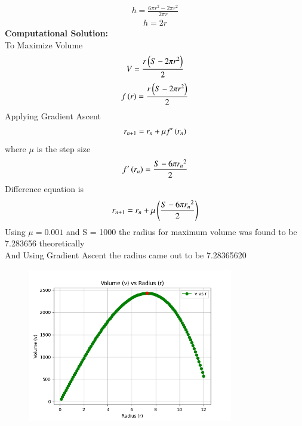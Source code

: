\documentclass[journal]{IEEEtran}
\numberwithin{equation}{enumi}
\numberwithin{figure}{enumi}
\begin{document}
\begin{align}
	h = \frac{6\pi r^2 - 2\pi r^2}{2\pi r}
\end{align}
\begin{align}
	h = 2r
\end{align}
\textbf{Computational Solution:} \\
To Maximize Volume 
\begin{align}
	V = \frac{r\left(S - 2\pi r^2\right)}{2} 
\end{align}
\begin{align}
	f\left(r\right) = \frac{r\left(S - 2\pi r^2\right)}{2}
\end{align}
Applying Gradient Ascent
\begin{align}
	r_{n+1} = r_n + \mu f^\prime\left(r_n\right)
\end{align}
where $\mu$ is the step size
\begin{align}
	f^\prime\left(r_n\right) = \frac{S - 6\pi {r_n}^2}{2}
\end{align}
Difference equation is
\begin{align}
	r_{n+1} = r_n + \mu \left(\frac{S - 6\pi {r_n}^2}{2}\right)
\end{align}
Using $\mu = 0.001$ and S = 1000 the radius for maximum volume was found to be 7.283656 theoretically \\
And Using Gradient Ascent the radius came out to be 7.28365620

\begin{figure}[H]
    \centering
    \includegraphics[width=0.8\textwidth]{figs/fig.png}
\end{figure}
\end{document}

